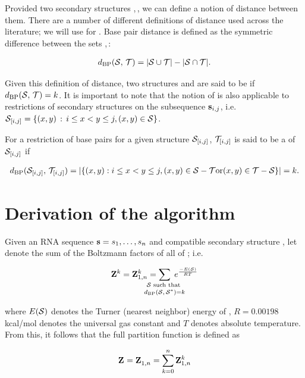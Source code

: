 Provided two secondary structures \str,\,\strT, we can define a notion of
distance between them. There are a number of different definitions of distance
used across the literature; we will use {\em \bpd} for \fftbor.
Base pair distance is defined as the symmetric difference between the sets
\str,\,\strT:

\begin{align}
\label{eq:fftbor:dBP}
\dBP{\str}{\strT} = |\str \cup \strT| - |\str \cap \strT|.
\end{align}

Given this definition of distance, two structures \str and \strT are said to
be \kNbrs if $d_{\text{BP}}(\mathcal S,\,\mathcal T) = k$. It is important to note that
the notion of \bpd is also applicable to restrictions of secondary structures
on the subsequence ${\bf s}_{i,j}$,
i.e. $\mathcal S_{[i,j]} = \{ (x,y) \,:\, i \leq  x < y \leq j,  (x,y) \in \mathcal S \}$.

For a restriction of base pairs for a given structure $\mathcal S_{[i,j]}$,
$\mathcal T_{[i,j]}$ is said to be a \kNbr of $\mathcal S_{[i,j]}$ if

\begin{align}
\label{eq:fftbor:dBPonRestriction}
\dBP{\str_{[i,j]}}{\strT_{[i,j]}} =
|\{ (x,y): i \leq x<y\leq j,
(x,y) \in \str - \strT \text{or} (x,y) \in \strT - \str \}| = k.
\end{align}

\section{Derivation of the \fftbor algorithm}
\label{sec:fftbor:math}

Given an RNA sequence ${\bf s}=s_1,\dots,s_n$ and compatible secondary structure
\strSt, let  denote the sum of the Boltzmann factors
\boltzf{\str} of all \kNbrs \str of \strSt; i.e.

\begin{align}
\bfZ{k}{} = \bfZ{k}{1,n} =
\sum_{\mathclap{\substack{\str \text{ such that } \rule[-.5ex]{0pt}{0pt} \\
 \dBP{\str}{\strSt}=k}}}\;
\boltzF{\str}
\end{align}

where $E(\mathcal S)$ denotes the Turner (nearest neighbor)
energy \cite{}
of \str, $R = 0.00198$ kcal/mol denotes the universal
gas constant and $T$ denotes absolute temperature. From this, it follows that
the full partition function is defined as

\begin{align}
\label{eq:fftbor:partFunc}
\bfZ{}{} = \bfZ{}{1,n} = \sum_{k=0}^n \bfZ{k}{1,n}
\end{align}

